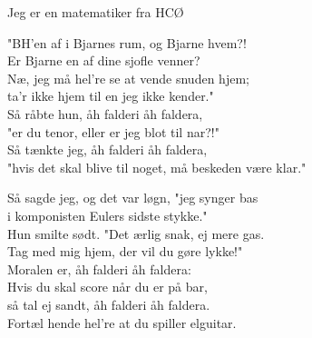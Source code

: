 \begin{song}{Jeg er en matematiker fra HCØ}
  \begin{SBVerse}
    "BH'en af i Bjarnes rum, og Bjarne hvem?!\\
    Er Bjarne en af dine sjofle venner?\\
    Næ, jeg må hel're se at vende snuden hjem;\\
    ta'r ikke hjem til en jeg ikke kender."\\\medskip
    Så råbte hun, åh falderi åh faldera,\\
    "er du tenor, eller er jeg blot til nar?!"\\
    Så tænkte jeg, åh falderi åh faldera,\\
    "hvis det skal blive til noget, må beskeden være klar."
  \end{SBVerse}

  \begin{SBVerse}
    Så sagde jeg, og det var løgn, "jeg synger bas\\
    i komponisten Eulers sidste stykke."\\
    Hun smilte sødt. "Det ærlig snak, ej mere gas.\\
    Tag med mig hjem, der vil du gøre lykke!"\\\medskip
    Moralen er, åh falderi åh faldera:\\
    Hvis du skal score når du er på bar,\\
    så tal ej sandt, åh falderi åh faldera.\\
    Fortæl hende hel're at du spiller elguitar.
  \end{SBVerse}
\end{song}